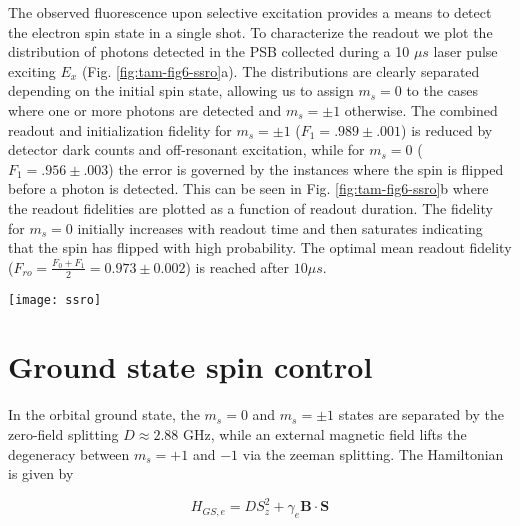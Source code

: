 The observed fluorescence upon selective excitation provides a means to detect the electron spin state in a single shot\cite{Robledo_Nature_2011}. To characterize the readout we plot the distribution of photons detected in the PSB collected during a 10 $\mu s$ laser pulse exciting $E_x$ (Fig. \ref{fig:tam-fig6-ssro}a). The distributions are clearly separated depending on the initial spin state, allowing us to assign $m_s = 0$ to the cases where one or more photons are detected and $m_s = \pm 1$ otherwise. The combined readout and initialization fidelity for $m_s = \pm 1$ ($F_1 = .989 \pm .001$) is reduced by detector dark counts and off-resonant excitation, while for $m_s = 0$ ($F_1 = .956 \pm .003$) the error is governed by the instances where the spin is flipped before a photon is detected. This can be seen in Fig. \ref{fig:tam-fig6-ssro}b where the readout fidelities are plotted as a function of readout duration. The fidelity for $m_s = 0$ initially increases with readout time and then saturates indicating that the spin has flipped with high probability. The optimal mean readout fidelity ($F_{ro} = \frac{F_0+F_1}{2} = 0.973 \pm 0.002$) is reached after $10 \mu s$.

\begin{figure*}
	\centering
	\texttt{[image: ssro]}
	\caption{\label{fig:tam-fig6-ssro} \textbf{Single shot readout} (a) Histograms of the number of detected photons in the PSB for initial state $m_s = 0$ (blue) and $m_s=\pm 1$ (red) during a 10 $\mu s$ readout on $E_x$. (b) Fidelities for reading out the electron spin state initially prepared in $m_s = 0$ (blue) and $m_s = \pm 1$ (red) as a function of readout duration. The mean readout fidelity is plotted in grey. The inset is a zoom of the region where the optimal mean readout fidelity is reached.}
\end{figure*}

\section{Ground state spin control}

In the orbital ground state, the $m_s = 0$ and $m_s = \pm 1$ states are separated by the zero-field splitting $D \approx 2.88$ GHz, while an external magnetic field lifts the degeneracy between $m_s = +1$ and $-1$ via the zeeman splitting. The Hamiltonian is given by

\begin{equation}
H_{GS,e} = D S_z^2 + \gamma_e \mathbf{B} \cdot \mathbf{S}
\end{equation}

